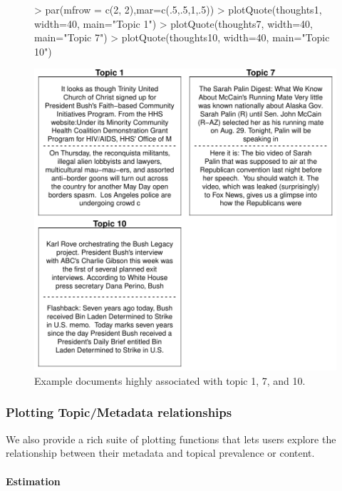 \documentclass[nojss]{jss}
\begin{document}
\begin{figure}[t!]
\begin{center}
\begin{Schunk}
\begin{Sinput}
> par(mfrow = c(2, 2),mar=c(.5,.5,1,.5))
> plotQuote(thoughts1, width=40, main="Topic 1")
> plotQuote(thoughts7, width=40, main="Topic 7")
> plotQuote(thoughts10, width=40, main="Topic 10")
\end{Sinput}
\end{Schunk}
\includegraphics{stmVignette-012}
\caption{Example documents highly associated with topic 1, 7, and 10.}
\label{fig:example}
\end{center}
\end{figure}



\subsubsection{Plotting Topic/Metadata relationships}
We also provide a rich suite of plotting functions that lets users explore the relationship between their metadata and topical prevalence or content.

\paragraph{Estimation}
\end{document}
